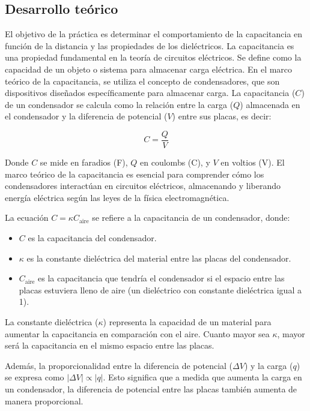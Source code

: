\documentclass{article}
\begin{document}
\begin{multicols}{2}

\section{Desarrollo teórico}\label{Desarrollo Teorico}                              	%
El objetivo de la práctica es determinar el comportamiento de la
capacitancia en función de la distancia y las
propiedades de los dieléctricos.
\cite{Quartux Enería}
La capacitancia es una propiedad fundamental en la teoría de circuitos eléctricos. Se define como la capacidad de un objeto o sistema para almacenar carga eléctrica. En el marco teórico de la capacitancia, se utiliza el concepto de condensadores, que son dispositivos diseñados específicamente para almacenar carga. La capacitancia (\(C\)) de un condensador se calcula como la relación entre la carga (\(Q\)) almacenada en el condensador y la diferencia de potencial (\(V\)) entre sus placas, es decir:

\[
C = \frac{Q}{V}
\]

Donde \(C\) se mide en faradios (F), \(Q\) en coulombs (C), y \(V\) en voltios (V). El marco teórico de la capacitancia es esencial para comprender cómo los condensadores interactúan en circuitos eléctricos, almacenando y liberando energía eléctrica según las leyes de la física electromagnética.

La ecuación \(C = \kappa C_{\text{aire}}\) se refiere a la capacitancia de un condensador, donde:

\begin{itemize}
    \item \(C\) es la capacitancia del condensador.
    \item \(\kappa\) es la constante dieléctrica del material entre las placas del condensador.
    \item \(C_{\text{aire}}\) es la capacitancia que tendría el condensador si el espacio entre las placas estuviera lleno de aire (un dieléctrico con constante dieléctrica igual a 1).
\end{itemize}

La constante dieléctrica (\(\kappa\)) representa la capacidad de un material para aumentar la capacitancia en comparación con el aire. Cuanto mayor sea \(\kappa\), mayor será la capacitancia en el mismo espacio entre las placas.

Además, la proporcionalidad entre la diferencia de potencial (\(\Delta V\)) y la carga (\(q\)) se expresa como \(|\Delta V| \propto |q|\). Esto significa que a medida que aumenta la carga en un condensador, la diferencia de potencial entre las placas también aumenta de manera proporcional.


\end{multicols}
\end{document}
